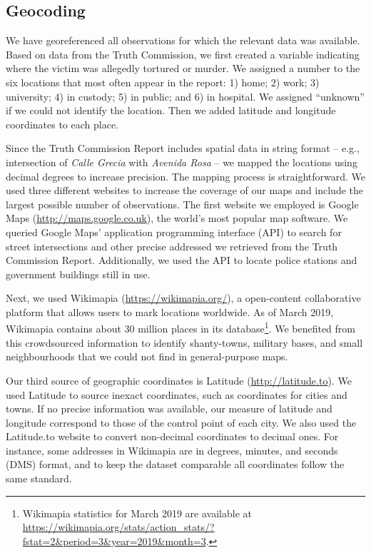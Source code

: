 \documentclass[12pt,a4paper,]{article}
\begin{document}
\hypertarget{geocoding}{%
\subsection{Geocoding}\label{geocoding}}

We have georeferenced all observations for which the relevant data was
available. Based on data from the Truth Commission, we first created a
variable indicating where the victim was allegedly tortured or murder.
We assigned a number to the six locations that most often appear in the
report: 1) home; 2) work; 3) university; 4) in custody; 5) in public;
and 6) in hospital. We assigned ``unknown'' if we could not identify the
location. Then we added latitude and longitude coordinates to each
place.

Since the Truth Commission Report includes spatial data in string format
-- e.g., intersection of \emph{Calle Grecia} with \emph{Avenida Rosa} --
we mapped the locations using decimal degrees to increase precision. The
mapping process is straightforward. We used three different websites to
increase the coverage of our maps and include the largest possible
number of observations. The first website we employed is Google Maps
(\url{http://maps.google.co.uk}), the world's most popular map software.
We queried Google Maps' application programming interface (API) to
search for street intersections and other precise addressed we retrieved
from the Truth Commission Report. Additionally, we used the API to
locate police stations and government buildings still in use.

Next, we used Wikimapia (\url{https://wikimapia.org/}), a open-content
collaborative platform that allows users to mark locations worldwide. As
of March 2019, Wikimapia contains about 30 million places in its
database\footnote{Wikimapia statistics for March 2019 are available at
  \url{https://wikimapia.org/stats/action_stats/?fstat=2\&period=3\&year=2019\&month=3}.}.
We benefited from this crowdsourced information to identify
shanty-towns, military bases, and small neighbourhoods that we could not
find in general-purpose maps.

Our third source of geographic coordinates is Latitude
(\url{http://latitude.to}). We used Latitude to source inexact
coordinates, such as coordinates for cities and towns. If no precise
information was available, our measure of latitude and longitude
correspond to those of the control point of each city. We also used the
Latitude.to website to convert non-decimal coordinates to decimal ones.
For instance, some addresses in Wikimapia are in degrees, minutes, and
seconds (DMS) format, and to keep the dataset comparable all coordinates
follow the same standard.
\end{document}
